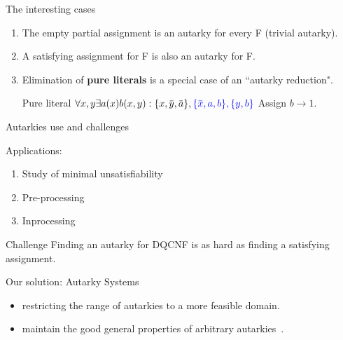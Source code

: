 \documentclass[xcolor=table	]{beamer}
\newcommand{\ov}[1]{\mkern 1.5mu\overline{\mkern-1.5mu#1\mkern-1.5mu}\mkern 1.5mu}
\begin{document}
\begin{frame}{The interesting cases}

\begin{enumerate}
	\item The empty partial assignment is an autarky for every F \newline (trivial autarky).\newline 
	
	\item A satisfying assignment for F is also an autarky for F. \newline
	\pause 
	\item Elimination of \textbf{pure literals} is a special case of an ``autarky reduction". 
	\newline
	\begin{exampleblock}{Pure literal}
			$\forall x, y \exists a(x) b(x,y) : \{x, \ov{y}, \ov{a}\}, \textcolor{blue}{\{\ov{x}, a, b\}, \{y, b\}} $ \newline 
		Assign $b \to 1$.
	\end{exampleblock}

\end{enumerate}



\end{frame}


\begin{frame}{Autarkies use and challenges}

Applications: 
\begin{enumerate}
    \item Study of minimal unsatisfiability~\cite{buning2009minimal}
    \item Pre-processing~\cite{wimmer2015preprocessing}
    \item Inprocessing~\cite{jarvisalo2012inprocessing}
\end{enumerate}

 \begin{exampleblock}{Challenge}
 Finding an autarky for DQCNF is as hard as finding a satisfying assignment.
\end{exampleblock}
    \pause 
  \begin{alertblock}{Our solution: Autarky Systems}
  \begin{itemize}
      \item restricting the range of autarkies to a more feasible domain.
      \item maintain the good general properties of arbitrary autarkies~\cite{buning2009minimal}.
  \end{itemize}
 
  \end{alertblock}

\end{frame}
\end{document}
